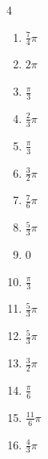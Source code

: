 \begin{multicols}{4}
\begin{enumerate}
  \item $\displaystyle \frac{7}{4}\pi$

  \item $\displaystyle 2\pi$

  \item $\displaystyle \frac{\pi}{3}$

  \item $\displaystyle \frac{2}{3}\pi$

  \item $\displaystyle \frac{\pi}{3}$

  \item $\displaystyle \frac{3}{2}\pi$

  \item $\displaystyle \frac{7}{6}\pi$

  \item $\displaystyle \frac{5}{3}\pi$

  \item $\displaystyle 0$

  \item $\displaystyle \frac{\pi}{3}$

  \item $\displaystyle \frac{5}{3}\pi$

  \item $\displaystyle \frac{5}{3}\pi$

  \item $\displaystyle \frac{3}{2}\pi$

  \item $\displaystyle \frac{\pi}{6}$

  \item $\displaystyle \frac{11}{6}\pi$

  \item $\displaystyle \frac{4}{3}\pi$


\end{enumerate}
\end{multicols}
